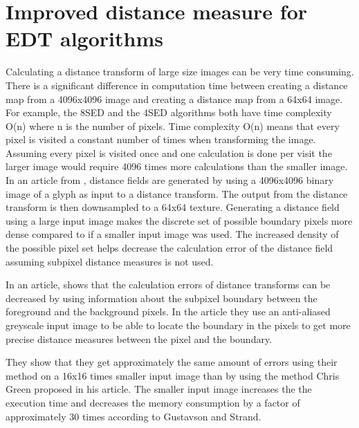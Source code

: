 \section{Improved distance measure for EDT algorithms}\label{limitEDT}
Calculating a distance transform of large size images can be very time consuming. There is a significant difference in computation time between creating a distance map from a 4096x4096 image and creating a distance map from a 64x64 image. For example, the 8SED and the 4SED algorithms both have time complexity O(n) where n is the number of pixels. Time complexity O(n) means that every pixel is visited a constant number of times when transforming the image. Assuming every pixel is visited once and one calculation is done per visit the larger image would require 4096 times more calculations than the smaller image. In an article from \citet{Green:2007}, distance fields are generated by using a 4096x4096 binary image of a glyph as input to a distance transform. The output from the distance transform is then downsampled to a 64x64 texture. Generating a distance field using a large input image makes the discrete set of possible boundary pixels more dense compared to if a smaller input image was used. The increased density of the possible pixel set helps decrease the calculation error of the distance field assuming subpixel distance measures is not used.

In an article, \citet{Gustavson:2011} shows that the calculation errors of distance transforms can be decreased by using information about the subpixel boundary between the foreground and the background pixels. In the article they use an anti-aliased greyscale input image to be able to locate the boundary in the pixels to get more precise distance measures between the pixel and the boundary. 

 They show that they get approximately the same amount of errors using their method on a 16x16 times smaller input image than by using the method Chris Green proposed in his article. The smaller input image increases the the execution time and decreases the memory consumption by a factor of approximately 30 times according to Gustavson and Strand.
